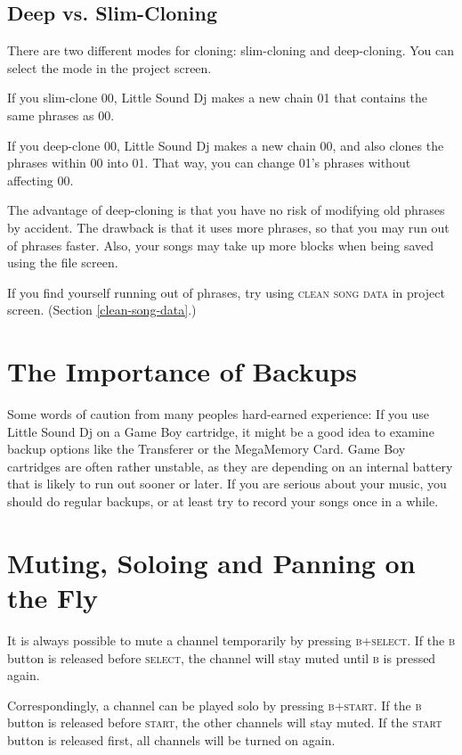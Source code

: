 \subsection{Deep vs. Slim-Cloning}

There are two different modes for cloning: slim-cloning and deep-cloning. You can select the mode in the project screen.

If you slim-clone 00, Little Sound Dj makes a new chain 01 that
contains the same phrases as 00.

If you deep-clone 00, Little Sound Dj makes a new chain 00, and
also clones the phrases within 00 into 01. That way,
you can change 01's phrases without affecting 00.

The advantage of deep-cloning is that you have no risk of modifying old phrases by accident. The drawback is that it uses more phrases, so that you may run out of phrases faster. Also, your songs may take up more blocks when being saved using the file screen.

If you find yourself running out of phrases, try using \textsc{clean song data} in project screen. (Section \ref{clean-song-data}.)

\section{The Importance of Backups}

Some words of caution from many peoples hard-earned experience: If you use Little Sound Dj on a Game Boy cartridge, it might be a good idea to examine backup options like the Transferer or the MegaMemory Card. Game Boy cartridges are often rather unstable, as they are depending on an internal battery that is likely to run out sooner or later. If you are serious about your music, you should do regular backups, or at least try to record your songs once in a while.

\section{Muting, Soloing and Panning on the Fly}

It is always possible to mute a channel temporarily by pressing \textsc{b+select}. If the \textsc{b} button is released before \textsc{select}, the channel will stay muted until \textsc{b} is pressed again.

Correspondingly, a channel can be played solo by pressing \textsc{b+start}. If the \textsc{b} button is released before \textsc{start}, the other channels will stay muted. If the \textsc{start} button is released first, all channels will be turned on again.

